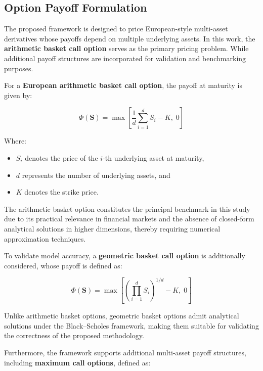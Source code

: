 \documentclass[12pt, a4paper]{article}
\begin{document}
\subsection{Option Payoff Formulation}

The proposed framework is designed to price European-style multi-asset
derivatives whose payoffs depend on multiple underlying assets. In this
work, the \textbf{arithmetic basket call option} serves as the primary
pricing problem. While additional payoff structures are incorporated
for validation and benchmarking purposes.

For a \textbf{European arithmetic basket call option}, the payoff at
maturity is given by:

\begin{equation}
    \Phi(\mathbf{S}) = \max\!\left[
        \frac{1}{d} \sum_{i=1}^{d} S_i - K,\; 0
    \right]
    \label{eq:arith_basket}
\end{equation}

Where:
\begin{itemize}
    \item $S_i$ denotes the price of the $i$-th underlying asset at
          maturity,
    \item $d$ represents the number of underlying assets, and
    \item $K$ denotes the strike price.
\end{itemize}

The arithmetic basket option constitutes the principal benchmark in
this study due to its practical relevance in financial markets and the
absence of closed-form analytical solutions in higher dimensions,
thereby requiring numerical approximation techniques.

To validate model accuracy, a \textbf{geometric basket call option} is
additionally considered, whose payoff is defined as:

\begin{equation}
    \Phi(\mathbf{S}) = \max\!\left[
        \left(\prod_{i=1}^{d} S_i\right)^{1/d} - K,\; 0
    \right]
    \label{eq:geom_basket}
\end{equation}

Unlike arithmetic basket options, geometric basket options admit
analytical solutions under the Black--Scholes framework, making them
suitable for validating the correctness of the proposed methodology.

Furthermore, the framework supports additional multi-asset payoff
structures, including \textbf{maximum call options}, defined as:
\end{document}
